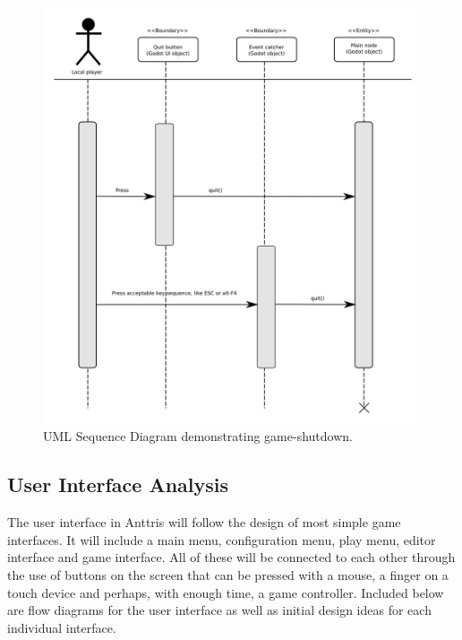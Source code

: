 \documentclass[12pt]{article}
\begin{document}
    \begin{figure}[H]
        \centering
        \includegraphics[width=6in]{sequence_quit.png}
        \caption{UML Sequence Diagram demonstrating game-shutdown.}
    \end{figure}




\subsection{User Interface Analysis}\label{UI-analysis-CA}
The user interface in Anttris will follow the design of most simple game interfaces. It will include a main menu, configuration menu, play menu, editor interface and game interface. All of these will be connected to each other through the use of buttons on the screen that can be pressed with a mouse, a finger on a touch device and perhaps, with enough time, a game controller. Included below are flow diagrams for the user interface as well as initial design ideas for each individual interface.\\
\end{document}
